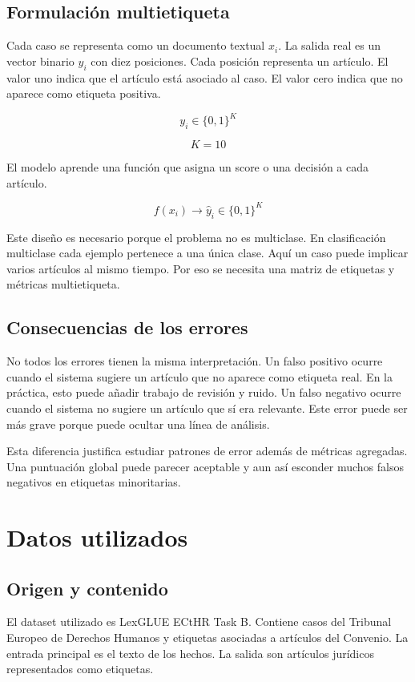 \documentclass[11pt,a4paper]{article}
\begin{document}
\subsection{Formulación multietiqueta}

Cada caso se representa como un documento textual \(x_i\). La salida real es un vector binario \(y_i\) con diez posiciones. Cada posición representa un artículo. El valor uno indica que el artículo está asociado al caso. El valor cero indica que no aparece como etiqueta positiva.

\[
y_i \in \{0,1\}^{K}
\]

\[
K = 10
\]

El modelo aprende una función que asigna un score o una decisión a cada artículo.

\[
f(x_i) \rightarrow \hat{y}_i \in \{0,1\}^{K}
\]

Este diseño es necesario porque el problema no es multiclase. En clasificación multiclase cada ejemplo pertenece a una única clase. Aquí un caso puede implicar varios artículos al mismo tiempo. Por eso se necesita una matriz de etiquetas y métricas multietiqueta.

\subsection{Consecuencias de los errores}

No todos los errores tienen la misma interpretación. Un falso positivo ocurre cuando el sistema sugiere un artículo que no aparece como etiqueta real. En la práctica, esto puede añadir trabajo de revisión y ruido. Un falso negativo ocurre cuando el sistema no sugiere un artículo que sí era relevante. Este error puede ser más grave porque puede ocultar una línea de análisis.

Esta diferencia justifica estudiar patrones de error además de métricas agregadas. Una puntuación global puede parecer aceptable y aun así esconder muchos falsos negativos en etiquetas minoritarias.

\section{Datos utilizados}
\label{sec_datos}

\subsection{Origen y contenido}

El dataset utilizado es LexGLUE ECtHR Task B. Contiene casos del Tribunal Europeo de Derechos Humanos y etiquetas asociadas a artículos del Convenio. La entrada principal es el texto de los hechos. La salida son artículos jurídicos representados como etiquetas.
\end{document}
